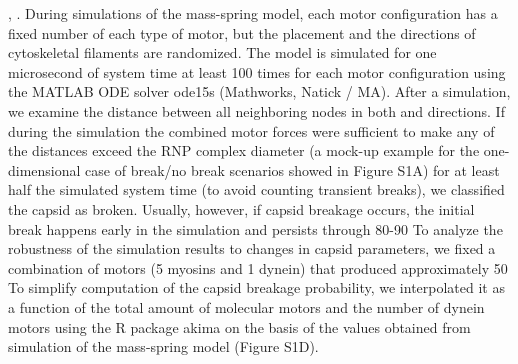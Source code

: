  ,  .
During simulations of the mass-spring model, each motor configuration has a fixed number of each type of motor, but the placement and the directions of cytoskeletal filaments are randomized. The model is simulated for one microsecond of system time at least 100 times for each motor configuration using the MATLAB ODE solver ode15s (Mathworks, Natick / MA).
After a simulation, we examine the distance between all neighboring nodes in both   and   directions. If during the simulation the combined motor forces were sufficient to make any of the distances exceed the RNP complex diameter (a mock-up example for the one-dimensional case of break/no break scenarios showed in Figure S1A) for at least half the simulated system time (to avoid counting transient breaks), we classified the capsid as broken. Usually, however, if capsid breakage occurs, the initial break happens early in the simulation and persists through 80-90%
To analyze the robustness of the simulation results to changes in capsid parameters, we fixed a combination of motors (5 myosins and 1 dynein) that produced approximately 50%
To simplify computation of the capsid breakage probability, we interpolated it as a function of the total amount of molecular motors and the number of dynein motors using the R package akima on the basis of the values obtained from simulation of the mass-spring model (Figure S1D).

